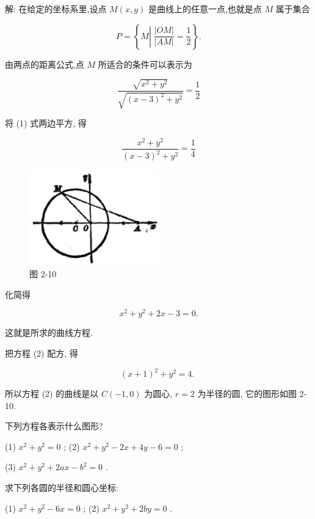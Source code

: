 \documentclass[lang=cn,newtx,10pt,scheme=chinese]{elegantbook}
\begin{document}
解: 在给定的坐标系里,设点 \(M\left( {x,y}\right)\) 是曲线上的任意一点,也就是点 \(M\) 属于集合

\[
  P = \left\{ {M\left| {\;\frac{\left| OM\right| }{\left| AM\right| } = \frac{1}{2}}\right. }\right\} .
\]

由两点的距离公式,点 \(M\) 所适合的条件可以表示为

\[
  \frac{\sqrt{{x}^{2} + {y}^{2}}}{\sqrt{{\left( x - 3\right) }^{2} + {y}^{2}}} = \frac{1}{2} \tag{1}
\]

将 (1) 式两边平方, 得

\[
  \frac{{x}^{2} + {y}^{2}}{{\left( x - 3\right) }^{2} + {y}^{2}} = \frac{1}{4}
\]

\begin{figure}[h]
  \centering
  \includegraphics[max width=0.5\textwidth]{images/01912cc2-ffb6-728e-9ae7-b113ff05c64b_84_125563.jpg}
  \caption{图 2-10}
\end{figure}



化简得

\[
    {x}^{2} + {y}^{2} + {2x} - 3 = 0. \tag{2}
\]

这就是所求的曲线方程.

把方程 (2) 配方, 得

\[
    {\left( x + 1\right) }^{2} + {y}^{2} = 4\text{. }
\]

所以方程 (2) 的曲线是以 \(C\left( {-1,0}\right)\) 为圆心, \(r = 2\) 为半径的圆, 它的图形如图 2-10.

\begin{problemset}[练习]

\item 下列方程各表示什么图形?

(1) \({x}^{2} + {y}^{2} = 0\) ; (2) \({x}^{2} + {y}^{2} - {2x} + {4y} - 6 = 0\) ;

(3) \({x}^{2} + {y}^{2} + {2ax} - {b}^{2} = 0\) .

\item 求下列各圆的半径和圆心坐标:

(1) \({x}^{2} + {y}^{2} - {6x} = 0\) ; (2) \({x}^{2} + {y}^{2} + {2by} = 0\) .
\end{problemset}
\end{document}
